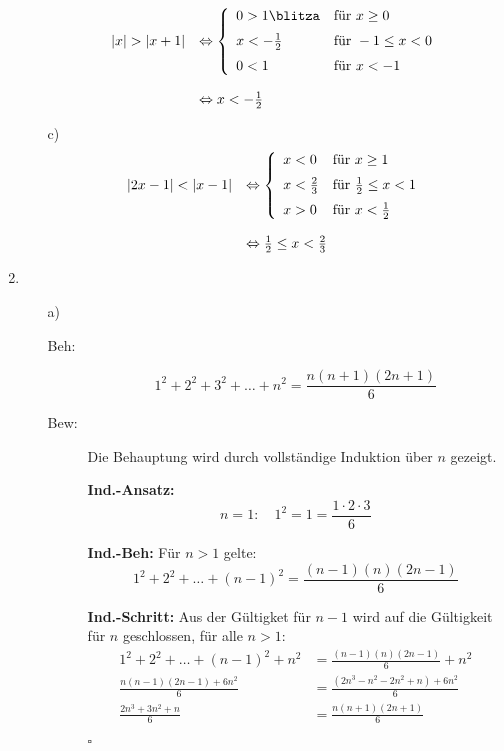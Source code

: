 \documentclass[12pt,a4paper,leqno]{article}
\begin{document}
\begin{enumerate}
\begin{enumerate}
	\begin{displaymath}
	\begin{array}{l l}
		|x| > |x+1| &\Leftrightarrow  \left\{
	\begin{array}{l l}
		  0 > 1 \textrm{\blitza} & \textrm{für } x \geq 0 \\[6pt]
		  x < -\frac{1}{2} & \textrm{für } -1 \leq x < 0 \\[6pt]
		  0 < 1 & \textrm{für } x < -1
	\end{array}\right.  \\ 
	\hfill \\
	& \Leftrightarrow x <  -\frac{1}{2} 
	\end{array}
	\end{displaymath}
	
\item[c)] 
	\begin{displaymath}
	\begin{array}{l l}
		|2x-1|<|x-1| &\Leftrightarrow  \left\{
	\begin{array}{l l}
		x < 0 & \textrm{für } x \geq 1 \\[6pt]
		x < \frac{2}{3}  & \textrm{für } \frac{1}{2} \leq x < 1 \\[6pt]
		x > 0  & \textrm{für } x < \frac{1}{2}
	\end{array}\right.  \\ 
	\hfill \\
	& \Leftrightarrow \frac{1}{2} \leq x < \frac{2}{3}
	\end{array}
	\end{displaymath}
\end{enumerate}

\item %


\begin{enumerate}
\item[a)] \hfill


\begin{description}
\item[Beh:] $$1^2 + 2^2 + 3^2 + \ldots + n^2 = \frac {n (n+1)(2n+1)} 6$$
\item[Bew:] Die Behauptung wird durch vollständige Induktion über $n$ gezeigt.

\textbf{Ind.-Ansatz: }
$$n = 1 : \quad 1 ^2 = 1 = \frac{1\cdot 2\cdot 3}{6}$$

\textbf{Ind.-Beh:}
Für $n>1$ gelte:
$$1^2+2^2+\ldots+ (n-1)^2 = \frac{(n-1)(n)(2n -1)}{6}$$


\textbf{Ind.-Schritt: }
Aus der Gültigket für $n-1$ wird auf die Gültigkeit für $n$ geschlossen, für alle $n > 1$:
\begin{align*}
1^2+2^2+\ldots+ (n-1)^2 + n^2 &=  \frac{(n-1)(n)(2n -1)}{6} + n^2\\[12pt]
\frac{n(n-1)(2n-1)+6n^2}{6} &= \frac{(2n^3-n^2-2n^2+n)+6n^2}{6} \\[12pt]
\frac{2n^3+3n^2+n}{6} &=\frac{n(n+1)(2n+1)}{6}
\end{align*}
\begin{flushright}$\square$\\[12pt]\end{flushright}
	

\end{description}
\end{enumerate}
\end{enumerate}
\end{document}
